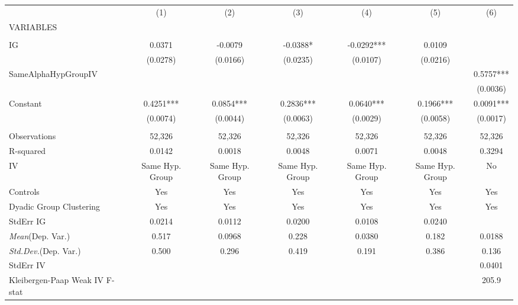 \documentclass[]{article}
\begin{document}
\begin{tabular}{lcccccc} \hline
 & (1) & (2) & (3) & (4) & (5) & (6) \\
VARIABLES &  &  &  &  &  &  \\ \hline
 &  &  &  &  &  &  \\
IG & 0.0371 & -0.0079 & -0.0388* & -0.0292*** & 0.0109 &  \\
 & (0.0278) & (0.0166) & (0.0235) & (0.0107) & (0.0216) &  \\
SameAlphaHypGroupIV &  &  &  &  &  & 0.5757*** \\
 &  &  &  &  &  & (0.0036) \\
Constant & 0.4251*** & 0.0854*** & 0.2836*** & 0.0640*** & 0.1966*** & 0.0091*** \\
 & (0.0074) & (0.0044) & (0.0063) & (0.0029) & (0.0058) & (0.0017) \\
 &  &  &  &  &  &  \\
Observations & 52,326 & 52,326 & 52,326 & 52,326 & 52,326 & 52,326 \\
R-squared & 0.0142 & 0.0018 & 0.0048 & 0.0071 & 0.0048 & 0.3294 \\
IV & Same Hyp. Group & Same Hyp. Group & Same Hyp. Group & Same Hyp. Group & Same Hyp. Group & No \\
Controls & Yes & Yes & Yes & Yes & Yes & Yes \\
Dyadic Group Clustering & Yes & Yes & Yes & Yes & Yes & Yes \\
StdErr IG & 0.0214 & 0.0112 & 0.0200 & 0.0108 & 0.0240 &  \\
\textit{Mean}(Dep. Var.) & 0.517 & 0.0968 & 0.228 & 0.0380 & 0.182 & 0.0188 \\
\textit{Std.Dev.}(Dep. Var.) & 0.500 & 0.296 & 0.419 & 0.191 & 0.386 & 0.136 \\
StdErr IV &  &  &  &  &  & 0.0401 \\
 Kleibergen-Paap Weak IV F-stat &  &  &  &  &  & 205.9 \\ \hline
\end{tabular}
\end{document}
